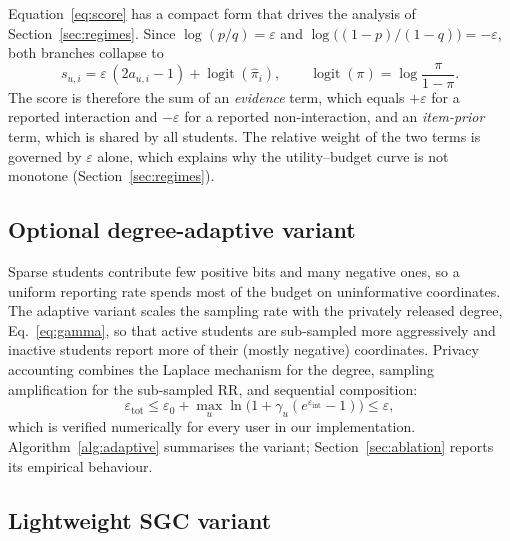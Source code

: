 \documentclass[pdflatex,sn-basic,Numbered]{sn-jnl}
\theoremstyle{plain}
\theoremstyle{remark}
\theoremstyle{definition}
\newcommand{\eps}{\varepsilon}
\newcommand{\logit}{\operatorname{logit}}
\begin{document}
Equation~\eqref{eq:score} has a compact form that drives the analysis of Section~\ref{sec:regimes}. Since $\log(p/q)=\eps$ and $\log\big((1-p)/(1-q)\big)=-\eps$, both branches collapse to
\begin{equation}\label{eq:decomposition}
s_{u,i}=\eps\,(2a_{u,i}-1)+\logit(\hat\pi_i),\qquad \logit(\pi)=\log\frac{\pi}{1-\pi}.
\end{equation}
The score is therefore the sum of an \emph{evidence} term, which equals $+\eps$ for a reported interaction and $-\eps$ for a reported non-interaction, and an \emph{item-prior} term, which is shared by all students. The relative weight of the two terms is governed by $\eps$ alone, which explains why the utility--budget curve is not monotone (Section~\ref{sec:regimes}).

\subsection{Optional degree-adaptive variant}\label{sec:adaptive}

Sparse students contribute few positive bits and many negative ones, so a uniform reporting rate spends most of the budget on uninformative coordinates. The adaptive variant scales the sampling rate with the privately released degree, Eq.~\eqref{eq:gamma}, so that active students are sub-sampled more aggressively and inactive students report more of their (mostly negative) coordinates. Privacy accounting combines the Laplace mechanism for the degree, sampling amplification for the sub-sampled RR, and sequential composition:
\begin{equation}\label{eq:budget}
\eps_{\text{tot}}\le\eps_0+\max_{u}\ln\!\big(1+\gamma_u(e^{\eps_{\text{int}}}-1)\big)\le\eps,
\end{equation}
which is verified numerically for every user in our implementation. Algorithm~\ref{alg:adaptive} summarises the variant; Section~\ref{sec:ablation} reports its empirical behaviour.

\subsection{Lightweight SGC variant}\label{sec:sgc}
\end{document}
